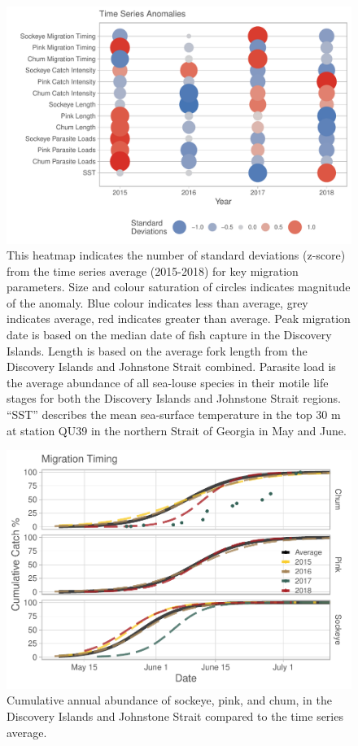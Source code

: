 \documentclass[fleqn,10pt]{wlpeerj} %
\begin{document}
\begin{figure}[H]
\includegraphics[width=0.95\linewidth]{Migration_Observations_Report_files/figure-latex/heatmap-1} \caption{This heatmap indicates the number of standard deviations (z-score) from the time series average (2015-2018) for key migration parameters. Size and colour saturation of circles indicates magnitude of the anomaly. Blue colour indicates less than average, grey indicates average, red indicates greater than average. Peak migration date is based on the median date of fish capture in the Discovery Islands. Length is based on the average fork length from the Discovery Islands and Johnstone Strait combined. Parasite load is the average abundance of all sea-louse species in their motile life stages for both the Discovery Islands and Johnstone Strait regions. “SST” describes the mean sea-surface temperature in the top 30 m at station QU39 in the northern Strait of Georgia in May and June.}\label{fig:heatmap}
\end{figure}

\begin{figure}[H]
\includegraphics[width=0.9\linewidth]{Migration_Observations_Report_files/figure-latex/migration-timing-plot-1} \caption{Cumulative annual abundance of sockeye, pink, and chum, in the Discovery Islands and Johnstone Strait compared to the time series average.}\label{fig:migration-timing-plot}
\end{figure}
\end{document}
